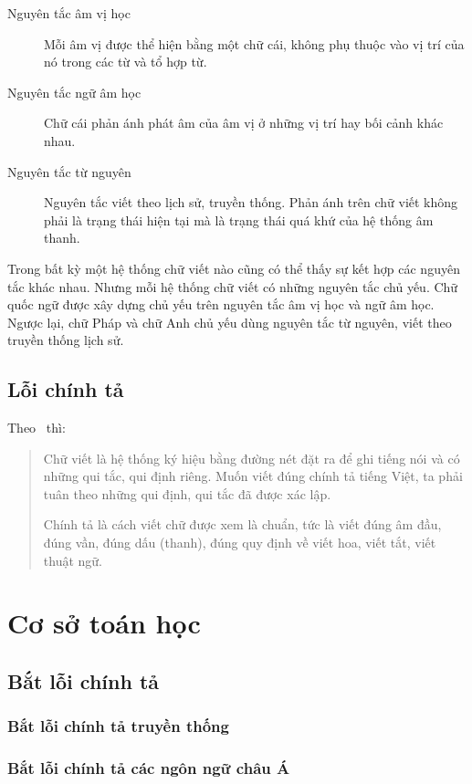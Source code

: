 \documentclass[a4paper,oneside]{book} %
\theoremstyle{break}
\begin{document}
\begin{description}
\item[Nguyên tắc âm vị học] Mỗi âm vị được thể hiện bằng một
  chữ cái, không phụ thuộc vào vị trí của nó trong các từ và tổ hợp
  từ. 
\item[Nguyên tắc ngữ âm học] Chữ cái phản ánh phát âm của âm vị ở
  những vị trí hay bối cảnh khác nhau.
\item[Nguyên tắc từ nguyên] Nguyên tắc viết theo lịch sử, truyền
  thống. Phản ánh trên chữ viết không phải là trạng thái hiện tại mà
  là trạng thái quá khứ của hệ thống âm thanh. 
\end{description}

Trong bất kỳ một hệ thống chữ viết nào cũng có thể thấy sự kết hợp các
nguyên tắc khác nhau. Nhưng mỗi hệ thống chữ viết có những nguyên tắc
chủ yếu. Chữ quốc ngữ được xây dựng chủ yếu trên nguyên tắc âm vị học
và ngữ âm học. Ngược lại, chữ Pháp và chữ Anh chủ yếu dùng nguyên tắc
từ nguyên, viết theo truyền thống lịch sử.

\section{Lỗi chính tả}

Theo~\cite{LoiChinhTa} thì:
\begin{verse}
  Chữ viết là hệ thống ký hiệu bằng đường nét đặt ra để ghi tiếng nói
  và có những qui tắc, qui định riêng. Muốn viết đúng chính tả tiếng
  Việt, ta phải tuân theo những qui định, qui tắc đã được xác lập.

  Chính tả là cách viết chữ được xem là chuẩn, tức là viết đúng âm
  đầu, đúng vần, đúng dấu (thanh), đúng quy định về viết hoa, viết
  tắt, viết thuật ngữ.
\end{verse}

\chapter{Cơ sở toán học}
\label{cha:math}
\minitoc


\section{Bắt lỗi chính tả}


\subsection{Bắt lỗi chính tả truyền thống}


\subsection{Bắt lỗi chính tả các ngôn ngữ châu Á}
\end{document}

